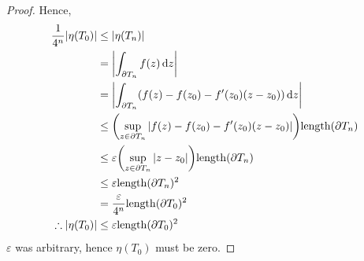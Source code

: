 \begin{proof}
	Hence,
	\begin{align*}
		\frac{1}{4^n} \abs{\eta(T_0)} &\leq \abs{\eta(T_n)} \\
		&= \abs{\int_{\partial T_n} f(z) \dd{z}} \\
		&= \abs{\int_{\partial T_n} (f(z) - f(z_0) - f'(z_0)(z - z_0)) \dd{z}} \\
		&\leq \qty(\sup_{z \in \partial T_n} \abs{f(z) - f(z_0) - f'(z_0)(z-z_0)}) \mathrm{length}(\partial T_n) \\
		&\leq \varepsilon \qty(\sup_{z \in \partial T_n} \abs{z - z_0}) \mathrm{length}(\partial T_n) \\
		&\leq \varepsilon \mathrm{length}(\partial T_n)^2 \\
		&= \frac{\varepsilon}{4^n} \mathrm{length}(\partial T_0)^2 \\
		\therefore \abs{\eta(T_0)} &\leq \varepsilon \mathrm{length}(\partial T_0)^2
	\end{align*}
	\( \varepsilon \) was arbitrary, hence \( \eta(T_0) \) must be zero.
\end{proof}
